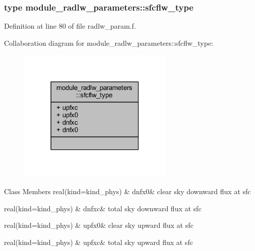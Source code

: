 \subsubsection{type module\+\_\+radlw\+\_\+parameters\+:\+:sfcflw\+\_\+type}


Definition at line 80 of file radlw\+\_\+param.\+f.



Collaboration diagram for module\+\_\+radlw\+\_\+parameters\+:\+:sfcflw\+\_\+type\+:\nopagebreak
\begin{figure}[H]
\begin{center}
\leavevmode
\includegraphics[width=210pt]{structmodule__radlw__parameters_1_1sfcflw__type__coll__graph}
\end{center}
\end{figure}
\begin{DoxyFields}{Class Members}
real(kind=kind\+\_\+phys)\hypertarget{namespacemodule__radlw__parameters_adac8d084ff59310f6c6f4fdff1a0e5e6}{}\label{namespacemodule__radlw__parameters_adac8d084ff59310f6c6f4fdff1a0e5e6}
&
dnfx0&
clear sky downward flux at sfc \\
\hline

real(kind=kind\+\_\+phys)\hypertarget{namespacemodule__radlw__parameters_ae65c0014042ceffec4293e4d300f9cb8}{}\label{namespacemodule__radlw__parameters_ae65c0014042ceffec4293e4d300f9cb8}
&
dnfxc&
total sky downward flux at sfc \\
\hline

real(kind=kind\+\_\+phys)\hypertarget{namespacemodule__radlw__parameters_ab186f43f5f87043de996c1fa6f59dc6e}{}\label{namespacemodule__radlw__parameters_ab186f43f5f87043de996c1fa6f59dc6e}
&
upfx0&
clear sky upward flux at sfc \\
\hline

real(kind=kind\+\_\+phys)\hypertarget{namespacemodule__radlw__parameters_ab281301c9fad950c86a379cdec0963aa}{}\label{namespacemodule__radlw__parameters_ab281301c9fad950c86a379cdec0963aa}
&
upfxc&
total sky upward flux at sfc \\
\hline

\end{DoxyFields}
\label{structmodule__radlw__parameters_1_1topflw__type}
\hypertarget{namespacemodule__radlw__parameters_structmodule__radlw__parameters_1_1topflw__type}{}
